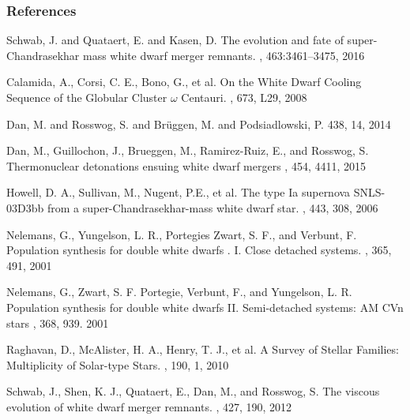 \documentclass{beamer}
\begin{document}
\begin{frame}[allowframebreaks]
  \frametitle<presentation>{References}
  \fontsize{6}{7.2}\selectfont
  \begin{thebibliography}{10}
    \beamertemplatearticlebibitems

      Schwab, J. and Quataert, E. and Kasen, D.
      \newblock The evolution and fate of super-Chandrasekhar mass white dwarf merger remnants.
      , 463:3461--3475, 2016

      Calamida, A., Corsi, C. E., Bono, G., et al.
      \newblock On the White Dwarf Cooling Sequence of the Globular Cluster $\omega$ Centauri.
      , 673, L29, 2008
      
        {Dan}, M. and {Rosswog}, S. and {Brüggen}, M. and {Podsiadlowski}, P.
       438, 14, 2014

       Dan, M., Guillochon, J., Brueggen, M., Ramirez-Ruiz, E., and Rosswog, S.
       \newblock Thermonuclear detonations ensuing white dwarf mergers
       , 454, 4411, 2015

       Howell, D. A., Sullivan, M., Nugent, P.E., et al. 
       \newblock The type Ia supernova SNLS-03D3bb from a super-Chandrasekhar-mass white dwarf star.
       , 443, 308, 2006 

       Nelemans, G., Yungelson, L. R., Portegies Zwart, S. F., and Verbunt, F. 
       \newblock Population synthesis for double white dwarfs . I. Close detached systems.
       , 365, 491, 2001

       Nelemans, G., Zwart, S. F. Portegie, Verbunt, F., and Yungelson, L. R. 
       \newblock Population synthesis for double white dwarfs II. Semi-detached systems: AM CVn stars
       , 368, 939. 2001

       Raghavan, D., McAlister, H. A., Henry, T. J., et al. 
       \newblock A Survey of Stellar Families: Multiplicity of Solar-type Stars.
       , 190, 1, 2010

       Schwab, J., Shen, K. J., Quataert, E., Dan, M., and Rosswog, S.
       \newblock The viscous evolution of white dwarf merger remnants.
       , 427, 190, 2012

 \end{thebibliography}
\end{frame}
\end{document}
